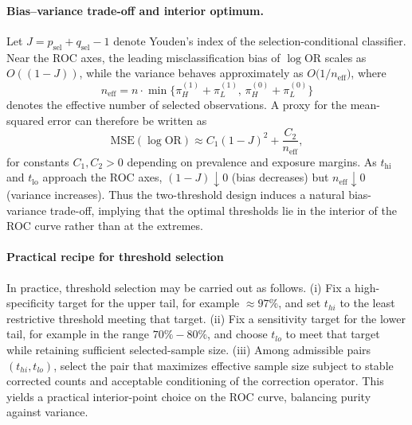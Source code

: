 \documentclass[pdflatex,sn-mathphys-num]{sn-jnl}%
\theoremstyle{thmstyleone}%
\theoremstyle{thmstyletwo}%
\theoremstyle{thmstylethree}%
\begin{document}
\paragraph{Bias–variance trade-off and interior optimum.}
Let $J=p_{\text{sel}}+q_{\text{sel}}-1$ denote Youden's index of the
selection-conditional classifier. Near the ROC axes, the leading
misclassification bias of $\log\mathrm{OR}$ scales as $O((1-J))$,
while the variance behaves approximately as
$O\!\big(1/n_{\text{eff}}\big)$, where
\[
n_{\text{eff}}=n\cdot\min\{\pi_H^{(1)}+\pi_L^{(1)},\,\pi_H^{(0)}+\pi_L^{(0)}\}
\]
denotes the effective number of selected observations. A proxy for the
mean-squared error can therefore be written as
\[
\mathrm{MSE}(\log\mathrm{OR}) \approx C_1(1-J)^2 + \frac{C_2}{n_{\text{eff}}},
\]
for constants $C_1,C_2>0$ depending on prevalence and exposure margins.
As $t_{\mathrm{hi}}$ and $t_{\mathrm{lo}}$ approach the ROC axes,
$(1-J)\downarrow0$ (bias decreases) but $n_{\text{eff}}\downarrow0$
(variance increases). Thus the two-threshold design induces a natural
bias-variance trade-off, implying that the optimal thresholds lie in
the interior of the ROC curve rather than at the extremes.

\paragraph{Practical recipe for threshold selection}
In practice, threshold selection may be carried out as follows. (i) Fix a high-specificity target for the upper tail, for example \(\approx 97\%\), and set \(t_{hi}\) to the least restrictive threshold meeting that target. (ii) Fix a sensitivity target for the lower tail, for example in the range \(70\%-80\%\), and choose \(t_{lo}\) to meet that target while retaining sufficient selected-sample size. (iii) Among admissible pairs \((t_{hi}, t_{lo})\), select the pair that maximizes effective sample size subject to stable corrected counts and acceptable conditioning of the correction operator. This yields a practical interior-point choice on the ROC curve, balancing purity against variance.
\end{document}
